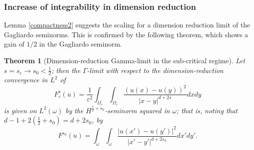 \documentclass[11pt]{article}
\newtheorem{theorem}[definition]{Theorem}
\def\e{\varepsilon}
\begin{document}
\subsubsection{Increase of integrability in dimension reduction}

Lemma \ref{compactness2} suggests the scaling for a dimension reduction limit of the Gagliardo seminorms. This is confirmed by the following theorem, which shows a gain of $1/2$ in the Gagliardo seminorm.

\begin{theorem}[Dimension-reduction Gamma-limit in the sub-critical regime]\label{drconv}
Let $s=s_\e\to s_0<\frac12$; then the $\Gamma$-limit with respect to the dimension-reduction convergence in $L^2$ of 
\begin{equation}\label{scaGa}
F_\e^s(u)=\frac1{\e^2} \int_{\Omega_\e}\int_{\Omega_\e}\frac{(u(x)-u(y))^2}{
|x-y|^{d+2s}}dxdy
\end{equation}
is given on $L^2(\omega)$ by the $H^{\frac12+s_0}$-seminorm squared in $\omega$; that is, noting that
$d-1+2(\frac12+s_0)=d+2s_0$, by 
$$
F^{s_0}(u)=\int_\omega\int_\omega 
\frac{|u(x')-u(y')|^2}{|x'-y'|^{d+2s_0}}dx' dy'.
$$
\end{theorem}
\end{document}
